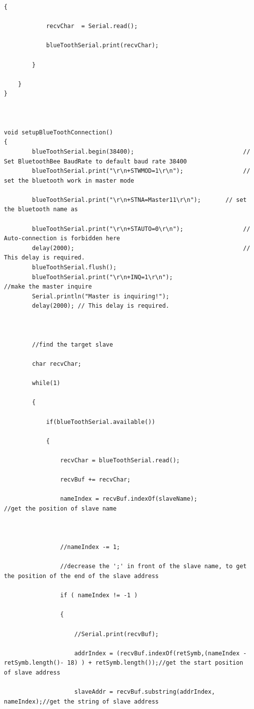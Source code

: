 \documentclass{article}
\begin{document}
\begin{lstlisting}[style=CStyle]
		{
	
			recvChar  = Serial.read();
			
			blueToothSerial.print(recvChar);
			
		}
	
	}
}



void setupBlueToothConnection()
{
		blueToothSerial.begin(38400);                               // Set BluetoothBee BaudRate to default baud rate 38400
		blueToothSerial.print("\r\n+STWMOD=1\r\n");                 // set the bluetooth work in master mode
		
		blueToothSerial.print("\r\n+STNA=Master11\r\n");       // set the bluetooth name as
		
		blueToothSerial.print("\r\n+STAUTO=0\r\n");                 // Auto-connection is forbidden here
		delay(2000);                                                // This delay is required.
		blueToothSerial.flush();
		blueToothSerial.print("\r\n+INQ=1\r\n");                    //make the master inquire
		Serial.println("Master is inquiring!");
		delay(2000); // This delay is required.
	
	
	
		//find the target slave
		
		char recvChar;

		while(1)
		
		{
		
			if(blueToothSerial.available())
			
			{
		
				recvChar = blueToothSerial.read();
				
				recvBuf += recvChar;
				
				nameIndex = recvBuf.indexOf(slaveName);             //get the position of slave name
		
		
		
				//nameIndex -= 1;
			
				//decrease the ';' in front of the slave name, to get the position of the end of the slave address
			
				if ( nameIndex != -1 )
			
				{
		
					//Serial.print(recvBuf);
		
					addrIndex = (recvBuf.indexOf(retSymb,(nameIndex - retSymb.length()- 18) ) + retSymb.length());//get the start position of slave address
					
					slaveAddr = recvBuf.substring(addrIndex, nameIndex);//get the string of slave address
					

\end{lstlisting}
\end{document}
